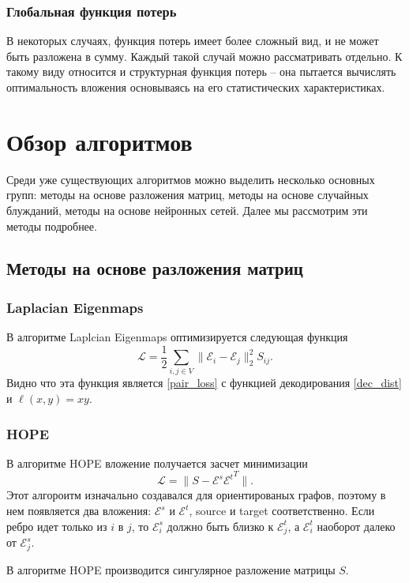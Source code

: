 \documentclass[12pt,a4paper]{extarticle}
\newcommand{\E}{\mathcal{E}}
\newcommand{\Loss}{\mathcal{L}}
\begin{document}
    \subsubsection{Глобальная функция потерь}
    В некоторых случаях, функция потерь имеет более сложный вид, и не может быть разложена в сумму. Каждый такой случай можно рассматривать отдельно. К такому виду относится и структурная функция потерь -- она пытается вычислять оптимальность вложения основываясь на его статистических характеристиках.

    \section{Обзор алгоритмов}
    Среди уже существующих алгоритмов можно выделить несколько основных групп: методы на основе разложения матриц, методы на основе случайных блужданий, методы на основе нейронных сетей. Далее мы рассмотрим эти методы подробнее.
    \subsection{Методы на основе разложения матриц}
    \subsubsection{Laplacian Eigenmaps \cite{laplacianeigenmaps}}
    В алгоритме Laplcian Eigenmaps оптимизируется следующая функция
    \begin{equation} \label{lapl_loss}
        \Loss = \frac{1}{2} \sum_{i, j \in V} \lVert \E_i - \E_j \rVert_2 ^ 2 S_{ij}.
    \end{equation}
    Видно что эта функция является \eqref{pair_loss} с функцией декодирования \eqref{dec_dist} и $\ell(x, y) = xy$.
    
    
    \subsubsection{HOPE \cite{HOPE}}
    
    В алгоритме HOPE вложение получается засчет минимизации
    \[
    \Loss = \lVert S - \E^s {\E^t}^T \rVert.
    \]
    Этот алгороитм изначально создавался для ориентированых графов, поэтому в нем появляется два вложения: $\E^s$ и $\E^t$, source и target соответственно. Если ребро идет только из $i$ в $j$, то $\E^s_i$ должно быть близко к $\E^t_j$, а $\E^t_i$ наоборот далеко от $\E^s_j$.
    
    В алгоритме HOPE производится сингулярное разложение матрицы $S$.
    
\end{document}
